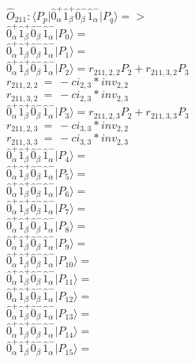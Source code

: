 \documentclass[14pt]{article}
\begin{document}
    $\hat{O}_{211}:  \langle{P_p}\vert \hat{0}_{\alpha}^{+}\hat{1}_{\beta}^{+}\hat{0}_{\beta}^{-}\hat{1}_{\alpha}^{-} \vert{P_q}\rangle => $ \\ 
    $ \hat{0}_{\alpha}^{+}\hat{1}_{\beta}^{+}\hat{0}_{\beta}^{-}\hat{1}_{\alpha}^{-} \vert{P_{0}}\rangle =  $ \\ 
    $ \hat{0}_{\alpha}^{+}\hat{1}_{\beta}^{+}\hat{0}_{\beta}^{-}\hat{1}_{\alpha}^{-} \vert{P_{1}}\rangle =  $ \\ 
    $ \hat{0}_{\alpha}^{+}\hat{1}_{\beta}^{+}\hat{0}_{\beta}^{-}\hat{1}_{\alpha}^{-} \vert{P_{2}}\rangle = {r}_{211,2,2}P_{2}+{r}_{211,3,2}P_{3} $ \\ 
    ${r}_{211,2,2}\ =\ -{ci}_{2,3}*{inv}_{2,2} $ \\ 
    ${r}_{211,3,2}\ =\ -{ci}_{2,3}*{inv}_{2,3} $ \\ 
    $ \hat{0}_{\alpha}^{+}\hat{1}_{\beta}^{+}\hat{0}_{\beta}^{-}\hat{1}_{\alpha}^{-} \vert{P_{3}}\rangle = {r}_{211,2,3}P_{2}+{r}_{211,3,3}P_{3} $ \\ 
    ${r}_{211,2,3}\ =\ -{ci}_{3,3}*{inv}_{2,2} $ \\ 
    ${r}_{211,3,3}\ =\ -{ci}_{3,3}*{inv}_{2,3} $ \\ 
    $ \hat{0}_{\alpha}^{+}\hat{1}_{\beta}^{+}\hat{0}_{\beta}^{-}\hat{1}_{\alpha}^{-} \vert{P_{4}}\rangle =  $ \\ 
    $ \hat{0}_{\alpha}^{+}\hat{1}_{\beta}^{+}\hat{0}_{\beta}^{-}\hat{1}_{\alpha}^{-} \vert{P_{5}}\rangle =  $ \\ 
    $ \hat{0}_{\alpha}^{+}\hat{1}_{\beta}^{+}\hat{0}_{\beta}^{-}\hat{1}_{\alpha}^{-} \vert{P_{6}}\rangle =  $ \\ 
    $ \hat{0}_{\alpha}^{+}\hat{1}_{\beta}^{+}\hat{0}_{\beta}^{-}\hat{1}_{\alpha}^{-} \vert{P_{7}}\rangle =  $ \\ 
    $ \hat{0}_{\alpha}^{+}\hat{1}_{\beta}^{+}\hat{0}_{\beta}^{-}\hat{1}_{\alpha}^{-} \vert{P_{8}}\rangle =  $ \\ 
    $ \hat{0}_{\alpha}^{+}\hat{1}_{\beta}^{+}\hat{0}_{\beta}^{-}\hat{1}_{\alpha}^{-} \vert{P_{9}}\rangle =  $ \\ 
    $ \hat{0}_{\alpha}^{+}\hat{1}_{\beta}^{+}\hat{0}_{\beta}^{-}\hat{1}_{\alpha}^{-} \vert{P_{10}}\rangle =  $ \\ 
    $ \hat{0}_{\alpha}^{+}\hat{1}_{\beta}^{+}\hat{0}_{\beta}^{-}\hat{1}_{\alpha}^{-} \vert{P_{11}}\rangle =  $ \\ 
    $ \hat{0}_{\alpha}^{+}\hat{1}_{\beta}^{+}\hat{0}_{\beta}^{-}\hat{1}_{\alpha}^{-} \vert{P_{12}}\rangle =  $ \\ 
    $ \hat{0}_{\alpha}^{+}\hat{1}_{\beta}^{+}\hat{0}_{\beta}^{-}\hat{1}_{\alpha}^{-} \vert{P_{13}}\rangle =  $ \\ 
    $ \hat{0}_{\alpha}^{+}\hat{1}_{\beta}^{+}\hat{0}_{\beta}^{-}\hat{1}_{\alpha}^{-} \vert{P_{14}}\rangle =  $ \\ 
    $ \hat{0}_{\alpha}^{+}\hat{1}_{\beta}^{+}\hat{0}_{\beta}^{-}\hat{1}_{\alpha}^{-} \vert{P_{15}}\rangle =  $ \\ 
    
\end{document}
